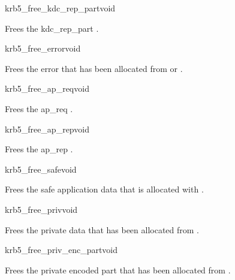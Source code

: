 \begin{funcdecl}{krb5_free_kdc_rep_part}{void}{\funcinout}
\end{funcdecl}

Frees the kdc_rep_part .

\begin{funcdecl}{krb5_free_error}{void}{\funcinout}
\end{funcdecl}

Frees the error  that has been allocated from
 or . 

\begin{funcdecl}{krb5_free_ap_req}{void}{\funcinout}
\end{funcdecl}

Frees the ap_req .

\begin{funcdecl}{krb5_free_ap_rep}{void}{\funcinout}
\end{funcdecl}

Frees the ap_rep .

\begin{funcdecl}{krb5_free_safe}{void}{\funcinout}
\end{funcdecl}

Frees the safe application data  that is allocated with
. 


\begin{funcdecl}{krb5_free_priv}{void}{\funcinout}
\end{funcdecl}

Frees the private data   that has been allocated from
. 

\begin{funcdecl}{krb5_free_priv_enc_part}{void}{\funcinout}
\end{funcdecl}

Frees the private encoded part  that has been allocated from
. 

